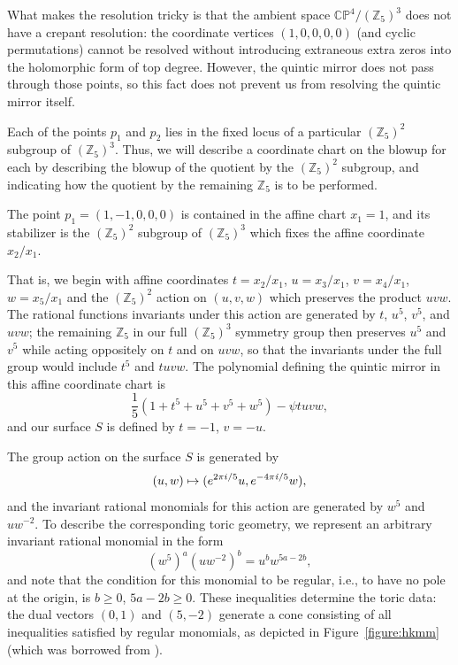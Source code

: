 What makes the resolution tricky is that the ambient space
$\mathbb{CP}^4/(\mathbb{Z}_5)^3$ does not have a crepant resolution: the
coordinate vertices $(1,0,0,0,0)$ (and cyclic permutations) cannot
be resolved without introducing extraneous extra zeros into
the holomorphic form of top degree.  
However, the quintic mirror does not pass through those
points, so this fact does not prevent us from resolving the quintic
mirror itself.

Each of the points $p_1$ and $p_2$ lies in the fixed locus of a particular
$(\mathbb{Z}_5)^2$ subgroup of $(\mathbb{Z}_5)^3$.  Thus, we will describe
a coordinate chart on the blowup for each by describing the blowup
of the quotient by the $(\mathbb{Z}_5)^2$ subgroup, and indicating how
the quotient by the remaining $\mathbb{Z}_5$ is to be performed.

The point $p_1=(1,-1,0,0,0)$ is
contained in the affine chart $x_1=1$, and its stabilizer
is the $(\mathbb{Z}_5)^2$ subgroup of $(\mathbb{Z}_5)^3$
which fixes the affine coordinate $x_2/x_1$.

That is, we begin with affine coordinates
$t=x_2/x_1$, $u=x_3/x_1$, $v=x_4/x_1$, 
$w=x_5/x_1$ and the $(\mathbb{Z}_5)^2$ action on $(u,v,w)$ which preserves
the product $uvw$.  The rational functions invariants under
 this action are generated by
$t$, $u^5$, $v^5$, 
and $uvw$; the remaining $\mathbb{Z}_5$ in our full $(\mathbb{Z}_5)^3$ symmetry
group then preserves $u^5$ and $v^5$ while acting 
oppositely on $t$ and on $uvw$, so that the invariants under the
full group would include $t^5$ and $tuvw$.
 The polynomial defining 
the quintic mirror in this affine  coordinate chart is
\[ \frac15\left(1 + t^5 + u^5 + v^5 + w^5\right) - \psi tuvw ,\]
and our surface $S$ is defined by $t=-1$, $v=-u$.

The group action on the surface $S$ is generated by
\[ (u,w)\mapsto (e^{2\pi i/5}u,e^{-4\pi {\it i}/5}w),\]
and the invariant rational monomials for this action are generated by
$w^5$ and $uw^{-2}$.  To describe the corresponding toric geometry,
we represent an arbitrary invariant rational monomial in the form
\[ (w^5)^a(uw^{-2})^b=u^bw^{5a-2b},\]
and note that the condition for this monomial to be regular, i.e.,
to have no pole at the origin, is
$b\ge0$, $5a-2b\ge0$.  These inequalities determine the toric data:
the dual vectors $(0,1)$ and $(5,-2)$ generate a cone consisting of
all inequalities satisfied by regular monomials, as depicted 
in Figure~\ref{figure:hkmm} (which was borrowed from \cite{Harvey:2001wm}).

